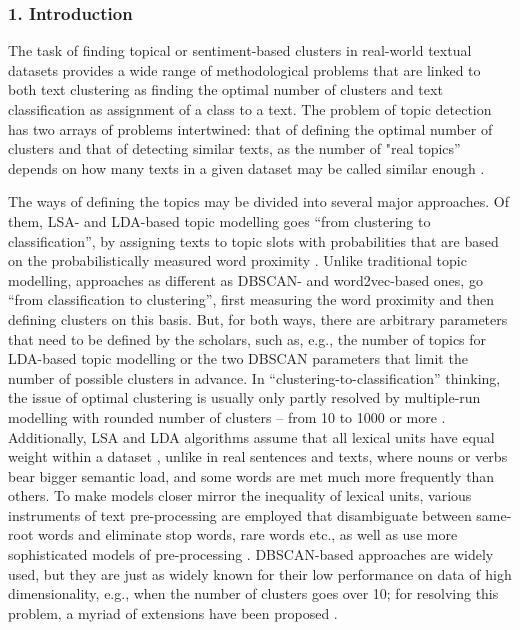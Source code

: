 \subsubsection{1. Introduction}

The task of finding topical or sentiment-based clusters in real-world textual datasets provides a wide range of methodological problems that are linked to both text clustering as finding the optimal number of clusters and text classification as assignment of a class to a text. The problem of topic detection has two arrays of problems intertwined: that of defining the optimal number of clusters and that of detecting similar texts, as the number of "real topics” depends on how many texts in a given dataset may be called similar enough \cite{NikolenkoKoltcovKoltsova}.

The ways of defining the topics may be divided into several major approaches. Of them, LSA- and LDA-based topic modelling goes “from clustering to classification”, by assigning texts to topic slots with probabilities that are based on the probabilistically measured word proximity \cite{Bodrunova2021}. Unlike traditional topic modelling, approaches as different as DBSCAN- and word2vec-based ones, go “from classification to clustering”, first measuring the word proximity and then defining clusters on this basis. But, for both ways, there are arbitrary parameters that need to be defined by the scholars, such as, e.g., the number of topics for LDA-based topic modelling or the two DBSCAN parameters that limit the number of possible clusters in advance. In “clustering-to-classification” thinking, the issue of optimal clustering is usually only partly resolved by multiple-run modelling with rounded number of clusters -- from 10 to 1000 or more \cite{GreeneCallaghanCunningham}. Additionally, LSA and LDA algorithms assume that all lexical units have equal weight within a dataset \cite{BleiNgJordan}, unlike in real sentences and texts, where nouns or verbs bear bigger semantic load, and some words are met much more frequently than others. To make models closer mirror the inequality of lexical units, various instruments of text pre-processing are employed that disambiguate between same-root words and eliminate stop words, rare words etc., as well as use more sophisticated models of pre-processing \cite{Bodrunova2021,SymeonidisEffrosynidisArampatzis}. DBSCAN-based approaches are widely used, but they are just as widely known for their low performance on data of high dimensionality, e.g., when the number of clusters goes over 10; for resolving this problem, a myriad of extensions have been proposed \cite{MittalGoyalHemanth}.

